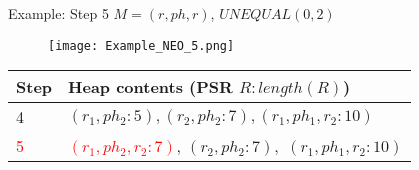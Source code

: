 \begin{frame}{Example: Step 5}
	$M = (r, ph, r)$, $UNEQUAL(0, 2)$
	
	\begin{figure}[h]
		\texttt{[image: Example\_NEO\_5.png]}
	\end{figure}
	
	\begin{table}[h]
		\centering
		\begin{tabular}{ |l|p{10cm}| } 
			\hline
			Step & Heap contents (PSR $R : length(R)$) \\
			\hline
			4 & $(r_1, ph_2 : 5), (r_2, ph_2 : 7), (r_1, ph_1, r_2 : 10)$ \\ 
			\hline
			\textcolor{red}{5} & \textcolor{red}{$(r_1, ph_2, r_2 : 7)$}, $(r_2, ph_2 : 7),$ \st{$(r_1, ph_1, r_2 : 10)$} \\ 
			\hline
		\end{tabular}
	\end{table}

\end{frame}


